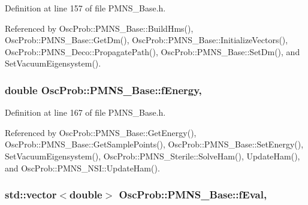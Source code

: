 Definition at line 157 of file P\+M\+N\+S\+\_\+\+Base.\+h.



Referenced by Osc\+Prob\+::\+P\+M\+N\+S\+\_\+\+Base\+::\+Build\+Hms(), Osc\+Prob\+::\+P\+M\+N\+S\+\_\+\+Base\+::\+Get\+Dm(), Osc\+Prob\+::\+P\+M\+N\+S\+\_\+\+Base\+::\+Initialize\+Vectors(), Osc\+Prob\+::\+P\+M\+N\+S\+\_\+\+Deco\+::\+Propagate\+Path(), Osc\+Prob\+::\+P\+M\+N\+S\+\_\+\+Base\+::\+Set\+Dm(), and Set\+Vacuum\+Eigensystem().

\subsubsection[{\texorpdfstring{f\+Energy}{fEnergy}}]{\setlength{\rightskip}{0pt plus 5cm}double Osc\+Prob\+::\+P\+M\+N\+S\+\_\+\+Base\+::f\+Energy\hspace{0.3cm}{\ttfamily [protected]}, {\ttfamily [inherited]}}\hypertarget{classOscProb_1_1PMNS__Base_a2800af6d436972f3e900867790c046b0}{}\label{classOscProb_1_1PMNS__Base_a2800af6d436972f3e900867790c046b0}


Definition at line 167 of file P\+M\+N\+S\+\_\+\+Base.\+h.



Referenced by Osc\+Prob\+::\+P\+M\+N\+S\+\_\+\+Base\+::\+Get\+Energy(), Osc\+Prob\+::\+P\+M\+N\+S\+\_\+\+Base\+::\+Get\+Sample\+Points(), Osc\+Prob\+::\+P\+M\+N\+S\+\_\+\+Base\+::\+Set\+Energy(), Set\+Vacuum\+Eigensystem(), Osc\+Prob\+::\+P\+M\+N\+S\+\_\+\+Sterile\+::\+Solve\+Ham(), Update\+Ham(), and Osc\+Prob\+::\+P\+M\+N\+S\+\_\+\+N\+S\+I\+::\+Update\+Ham().

\subsubsection[{\texorpdfstring{f\+Eval}{fEval}}]{\setlength{\rightskip}{0pt plus 5cm}std\+::vector$<$double$>$ Osc\+Prob\+::\+P\+M\+N\+S\+\_\+\+Base\+::f\+Eval\hspace{0.3cm}{\ttfamily [protected]}, {\ttfamily [inherited]}}\hypertarget{classOscProb_1_1PMNS__Base_a6319c34d7decbb9d7d6da279c06e8c2d}{}\label{classOscProb_1_1PMNS__Base_a6319c34d7decbb9d7d6da279c06e8c2d}


